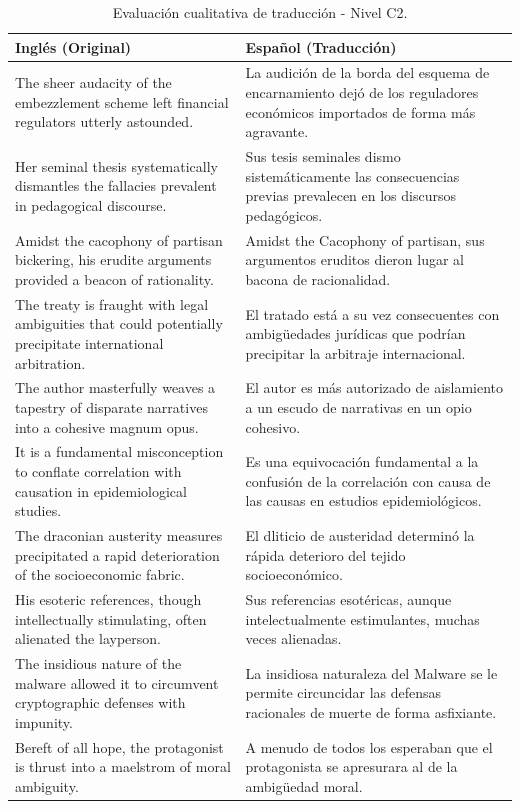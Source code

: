 \begin{table}[t]
    \centering
    \begin{tabular}{p{} p{}}
        \toprule
        \textbf{Inglés (Original)} & \textbf{Español (Traducción)} \\
        \midrule
        The sheer audacity of the embezzlement scheme left financial regulators utterly astounded. & La audición de la borda del esquema de encarnamiento dejó de los reguladores económicos importados de forma más agravante. \\
        Her seminal thesis systematically dismantles the fallacies prevalent in pedagogical discourse. & Sus tesis seminales dismo sistemáticamente las consecuencias previas prevalecen en los discursos pedagógicos. \\
        Amidst the cacophony of partisan bickering, his erudite arguments provided a beacon of rationality. & Amidst the Cacophony of partisan, sus argumentos eruditos dieron lugar al bacona de racionalidad. \\
        The treaty is fraught with legal ambiguities that could potentially precipitate international arbitration. & El tratado está a su vez consecuentes con ambigüedades jurídicas que podrían precipitar la arbitraje internacional. \\
        The author masterfully weaves a tapestry of disparate narratives into a cohesive magnum opus. & El autor es más autorizado de aislamiento a un escudo de narrativas en un opio cohesivo. \\
        It is a fundamental misconception to conflate correlation with causation in epidemiological studies. & Es una equivocación fundamental a la confusión de la correlación con causa de las causas en estudios epidemiológicos. \\
        The draconian austerity measures precipitated a rapid deterioration of the socioeconomic fabric. & El dliticio de austeridad determinó la rápida deterioro del tejido socioeconómico. \\
        His esoteric references, though intellectually stimulating, often alienated the layperson. & Sus referencias esotéricas, aunque intelectualmente estimulantes, muchas veces alienadas. \\
        The insidious nature of the malware allowed it to circumvent cryptographic defenses with impunity. & La insidiosa naturaleza del Malware se le permite circuncidar las defensas racionales de muerte de forma asfixiante. \\
        Bereft of all hope, the protagonist is thrust into a maelstrom of moral ambiguity. & A menudo de todos los esperaban que el protagonista se apresurara al de la ambigüedad moral. \\
        \bottomrule
    \end{tabular}
    \caption{Evaluación cualitativa de traducción - Nivel C2.}
    \label{tab:evaluacion_C2}
\end{table}
